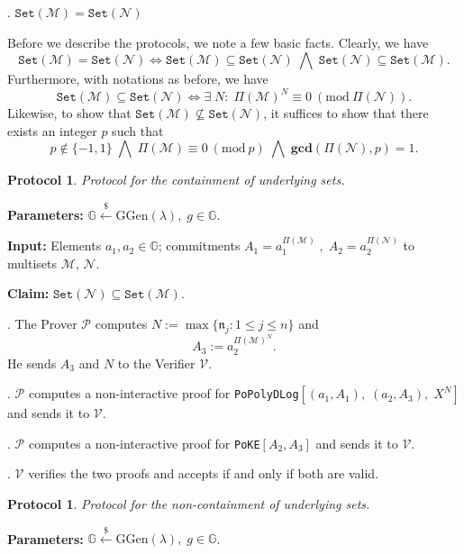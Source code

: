 \documentclass[11pt, lettersize, notitlepage, leqno, footskip=0.6cm]{article}
\newcommand{\ttt}{\texttt}
\newcommand{\sett}{\ttt{Set}}
\newcommand{\LRA}{\Longleftrightarrow}
\newcommand{\mf}{\mathfrak}
\newcommand{\mc}{\mathcal}
\newcommand{\mb}{\mathbb}
\newcommand{\mbf}{\mathbf}
\newcommand{\mr}{\mathrm}
\newcommand{\lamb}{\lambda}
\newcommand{\sub}{\subseteq}
\newcommand{\nsub}{\nsubseteq}
\newcommand{\mP}{\mc{P}}
\newcommand{\V}{\mc{V}}
\newcommand{\vs}{\vspace{-0.15cm}}
\newcommand{\noin}{\noindent}
\newcommand{\Mod}[1]{\ (\mathrm{mod}\ #1)}
\newcommand{\GCD}{\mbf{gcd}}
\newtheorem{Prot}[Thm]{Protocol}
\numberwithin{equation}{section}
\begin{document}
\noin 3. $\sett(\mc{M}) = \sett(\mc{N})$ \vspace{0.1cm}

\noin Before we describe the protocols, we note a few basic facts. Clearly, we have \vs $$\sett(\mc{M}) = \sett(\mc{N})\LRA \sett(\mc{M}) \sub \sett(\mc{N})\;\bigwedge\; \sett(\mc{N}) \sub \sett(\mc{M}).$$ Furthermore, with notations as before, we have \vs $$\sett(\mc{M})\sub \sett(\mc{N})\LRA \exists\; N:\;\Pi(\mc{M})^N\equiv 0\Mod{\Pi(\mc{N})}.$$ Likewise, to show that $\sett(\mc{M})\nsub \sett(\mc{N})$, it suffices to show that there exists an integer $p$ such that \vs $$p\notin \{-1,1\}   \;\bigwedge\;\Pi(\mc{M})\equiv 0\Mod{p} \;\bigwedge\; \GCD(\Pi(\mc{N}),{p})=1.$$ 


\begin{Prot} Protocol for the containment of underlying sets.\end{Prot} \vspace{-0.3cm}

\noin \textbf{Parameters:} $\mb{G}\xleftarrow{\$} \mr{GGen}(\lamb), \; g\in \mb{G}$.

\noin \textbf{Input:} Elements $a_1,a_2\in\mb{G}$; commitments $A_1 = a_1^{\Pi(\mc{M})}\;,\;A_2 = a_2^{\Pi(\mc{N})}$ to multisets $\mc{M}$, $\mc{N}$.

\noin \textbf{Claim:} $\sett(\mc{N})\sub \sett(\mc{M})$.

\begin{prf1}\normalfont \noin 1. The Prover $\mP$ computes $N:= \max\{\mf{n}_j:1\leq j\leq n \}$ and \vs $$A_3:= a_2^{\Pi(\mc{M})^N}.$$ He sends $A_3$ and $N$ to the Verifier $\V$.

\noin 2. $\mP$ computes a non-interactive proof for \verb|PoPolyDLog|$[(a_1, A_1),\;(a_2, A_3),\;X^N]$ and sends it to $\V$.

\noin 3. $\mP$ computes a non-interactive proof for \verb|PoKE|$[A_2,A_3]$ and sends it to $\V$.

\noin 4. $\V$ verifies the two proofs and accepts if and only if both are valid.\end{prf1}

\vspace{0.15cm}

\begin{Prot} Protocol for the non-containment of underlying sets.\end{Prot}\vspace{-0.3cm}

\noin \textbf{Parameters:} $\mb{G}\xleftarrow{\$} \mr{GGen}(\lamb), \; g\in \mb{G}$. 
\end{document}

